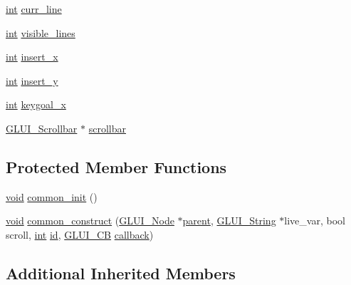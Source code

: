 \begin{DoxyCompactItemize}
\item 
\hyperlink{wglext_8h_a500a82aecba06f4550f6849b8099ca21}{int} \hyperlink{class_g_l_u_i___text_box_a965e17d22020a0e94bdae6e1147c8c15}{curr\+\_\+line}
\item 
\hyperlink{wglext_8h_a500a82aecba06f4550f6849b8099ca21}{int} \hyperlink{class_g_l_u_i___text_box_a6325bbadbe462f57a1a05c66c545095f}{visible\+\_\+lines}
\item 
\hyperlink{wglext_8h_a500a82aecba06f4550f6849b8099ca21}{int} \hyperlink{class_g_l_u_i___text_box_ab682369bd28b63c4244895325e9201a4}{insert\+\_\+x}
\item 
\hyperlink{wglext_8h_a500a82aecba06f4550f6849b8099ca21}{int} \hyperlink{class_g_l_u_i___text_box_a8da3e5a7311a4fce73cfdf928bb32353}{insert\+\_\+y}
\item 
\hyperlink{wglext_8h_a500a82aecba06f4550f6849b8099ca21}{int} \hyperlink{class_g_l_u_i___text_box_ab15cbe014282ee8fa1352211d9dc21c9}{keygoal\+\_\+x}
\item 
\hyperlink{class_g_l_u_i___scrollbar}{G\+L\+U\+I\+\_\+\+Scrollbar} $\ast$ \hyperlink{class_g_l_u_i___text_box_aaabf0fb6c07d0a5d1f46b258e00f5461}{scrollbar}
\end{DoxyCompactItemize}
\subsection*{Protected Member Functions}
\begin{DoxyCompactItemize}
\item 
\hyperlink{wglext_8h_a9e6b7f1933461ef318bb000d6bd13b83}{void} \hyperlink{class_g_l_u_i___text_box_a641773e896a194d6413b4e04e27b9b6d}{common\+\_\+init} ()
\item 
\hyperlink{wglext_8h_a9e6b7f1933461ef318bb000d6bd13b83}{void} \hyperlink{class_g_l_u_i___text_box_a7db40231829baa67a57656a5a29b4473}{common\+\_\+construct} (\hyperlink{class_g_l_u_i___node}{G\+L\+U\+I\+\_\+\+Node} $\ast$\hyperlink{class_g_l_u_i___node_a8ed65d447784f6f88bd3e2e2bcac6cdb}{parent}, \hyperlink{glui_8h_aada824856f7bcf29794719981ebd8f60}{G\+L\+U\+I\+\_\+\+String} $\ast$live\+\_\+var, bool scroll, \hyperlink{wglext_8h_a500a82aecba06f4550f6849b8099ca21}{int} \hyperlink{glext_8h_a58c2a664503e14ffb8f21012aabff3e9}{id}, \hyperlink{class_g_l_u_i___c_b}{G\+L\+U\+I\+\_\+\+C\+B} \hyperlink{class_g_l_u_i___control_a96060fe0cc6d537e736dd6eef78e24ab}{callback})
\end{DoxyCompactItemize}
\subsection*{Additional Inherited Members}


